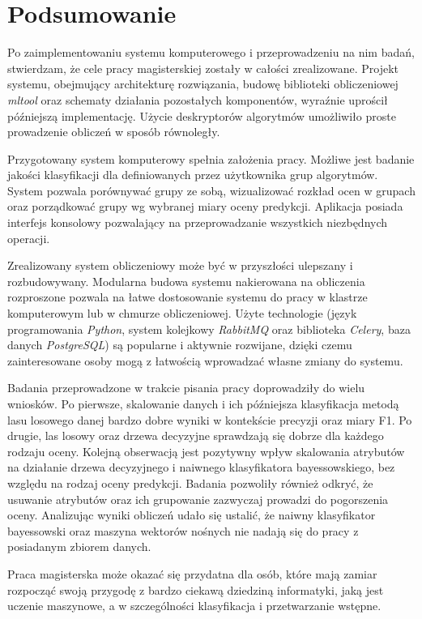 \documentclass[../thesis.tex]{subfiles}
\begin{document}
\pagestyle{plain}
\chapter{Podsumowanie}

Po zaimplementowaniu systemu komputerowego i przeprowadzeniu na nim badań, stwierdzam, że cele pracy magisterskiej zostały w całości zrealizowane. Projekt systemu, obejmujący architekturę rozwiązania, budowę biblioteki obliczeniowej \emph{mltool} oraz schematy działania pozostałych komponentów, wyraźnie uprościł późniejszą implementację. Użycie deskryptorów algorytmów umożliwiło proste prowadzenie obliczeń w sposób równoległy. 

Przygotowany system komputerowy spełnia założenia pracy. Możliwe jest badanie jakości klasyfikacji dla definiowanych przez użytkownika grup algorytmów. System pozwala porównywać grupy ze sobą, wizualizować rozkład ocen w grupach oraz porządkować grupy wg wybranej miary oceny predykcji. Aplikacja posiada interfejs konsolowy pozwalający na przeprowadzanie wszystkich niezbędnych operacji.

Zrealizowany system obliczeniowy może być w przyszłości ulepszany i rozbudowywany. Modularna budowa systemu nakierowana na obliczenia rozproszone pozwala na łatwe dostosowanie systemu do pracy w klastrze komputerowym lub w chmurze obliczeniowej. Użyte technologie (język programowania \emph{Python}, system kolejkowy \emph{RabbitMQ} oraz biblioteka \emph{Celery}, baza danych \emph{PostgreSQL}) są popularne i aktywnie rozwijane, dzięki czemu zainteresowane osoby mogą z łatwością wprowadzać własne zmiany do systemu.

Badania przeprowadzone w trakcie pisania pracy doprowadziły do wielu wniosków. Po pierwsze, skalowanie danych i ich późniejsza klasyfikacja metodą lasu losowego danej bardzo dobre wyniki w kontekście precyzji oraz miary F1. Po drugie, las losowy oraz drzewa decyzyjne sprawdzają się dobrze dla każdego rodzaju oceny. Kolejną obserwacją jest pozytywny wpływ skalowania atrybutów na działanie drzewa decyzyjnego i naiwnego klasyfikatora bayessowskiego, bez względu na rodzaj oceny predykcji. Badania pozwoliły również odkryć, że usuwanie atrybutów oraz ich grupowanie zazwyczaj prowadzi do pogorszenia oceny. Analizując wyniki obliczeń udało się ustalić, że naiwny klasyfikator bayessowski oraz maszyna wektorów nośnych nie nadają się do pracy z posiadanym zbiorem danych.

Praca magisterska może okazać się przydatna dla osób, które mają zamiar rozpocząć swoją przygodę z bardzo ciekawą dziedziną informatyki, jaką jest uczenie maszynowe, a w szczególności klasyfikacja i przetwarzanie wstępne.
\end{document}

